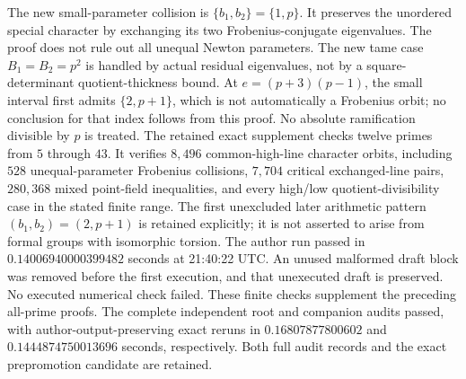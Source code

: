\begin{remark}
\label{rem:B-RD70-scope}
The new small-parameter collision is \(\{b_1,b_2\}=\{1,p\}\).
It preserves the unordered special character by exchanging its
two Frobenius-conjugate eigenvalues. The proof does not rule out
all unequal Newton parameters.
The new tame case \(B_1=B_2=p^2\) is handled by actual residual
eigenvalues, not by a square-determinant quotient-thickness bound.
At \(e=(p+3)(p-1)\), the small interval first admits
\(\{2,p+1\}\), which is not automatically a Frobenius orbit;
no conclusion for that index follows from this proof.
No absolute ramification divisible by \(p\) is treated.
The retained exact supplement
checks twelve primes from \(5\) through \(43\).
It verifies \(8{,}496\) common-high-line character orbits,
including \(528\) unequal-parameter Frobenius collisions,
\(7{,}704\) critical exchanged-line pairs,
\(280{,}368\) mixed point-field inequalities, and every
high/low quotient-divisibility case in the stated finite range.
The first unexcluded later arithmetic pattern
\((b_1,b_2)=(2,p+1)\) is retained explicitly; it is not
asserted to arise from formal groups with isomorphic torsion.
The author run passed in \(0.14006940000399482\) seconds at
21:40:22 UTC. An unused malformed draft block was removed
before the first execution, and that unexecuted draft is
preserved. No executed numerical check failed.
These finite checks supplement the preceding all-prime proofs.
The complete independent root and companion audits passed,
with author-output-preserving exact reruns in
\(0.16807877800602\) and \(0.1444874750013696\) seconds,
respectively. Both full audit records and the exact
prepromotion candidate are retained.
\end{remark}
